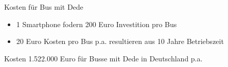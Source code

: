 
\begin{frame}{Kosten für Bus mit Dede}
  \begin{itemize}
  \item 1 Smartphone fodern 200 Euro Investition pro Bus
  \item 20 Euro Kosten pro Bus p.a. resultieren aus 10 Jahre Betriebszeit
  \end{itemize}
  \begin{block}{Kosten}
    1.522.000 Euro für Busse mit Dede in Deutschland p.a.
  \end{block}
\end{frame}
